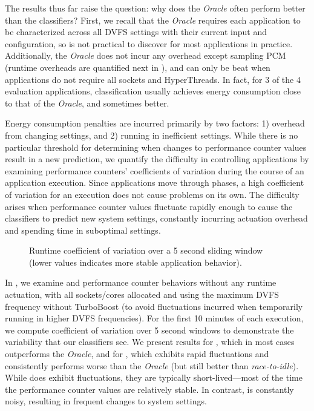The results thus far raise the question: why does the \emph{Oracle} often perform better than the classifiers?
First, we recall that the \emph{Oracle} requires each application to be characterized across all DVFS settings with their current input and configuration, so is not practical to discover for most applications in practice.
Additionally, the \emph{Oracle} does not incur any overhead except sampling PCM (runtime overheads are quantified next in ), and can only be beat when applications do not require all sockets and HyperThreads.
In fact, for 3 of the 4 evaluation applications, classification usually achieves energy consumption close to that of the \emph{Oracle}, and sometimes better.

Energy consumption penalties are incurred primarily by two factors: 1) overhead from changing settings, and 2) running in inefficient settings.
While there is no particular threshold for determining when changes to performance counter values result in a new prediction, we quantify the difficulty in controlling applications by examining performance counters' coefficients of variation during the course of an application execution.
Since applications move through phases, a high coefficient of variation for an execution does not cause problems on its own.
The difficulty arises when performance counter values fluctuate rapidly enough to cause the classifiers to predict new system settings, constantly incurring actuation overhead and spending time in suboptimal settings.

\begin{figure}[t]
  \centering
  
  \caption{Runtime coefficient of variation over a 5 second sliding window (lower values indicates more stable application behavior).}
  \label{fig:cv}
\end{figure}

In , we examine  and  performance counter behaviors without any runtime actuation, with all sockets/cores allocated and using the maximum DVFS frequency without TurboBoost (to avoid fluctuations incurred when temporarily running in higher DVFS frequencies).
For the first 10 minutes of each execution, we compute coefficient of variation over 5 second windows to demonstrate the variability that our classifiers see.
We present results for , which in most cases outperforms the \emph{Oracle}, and for , which exhibits rapid fluctuations and consistently performs worse than the \emph{Oracle} (but still better than \emph{race-to-idle}).
While  does exhibit fluctuations, they are typically short-lived---most of the time the performance counter values are relatively stable.
In contrast,  is constantly noisy, resulting in frequent changes to system settings.

